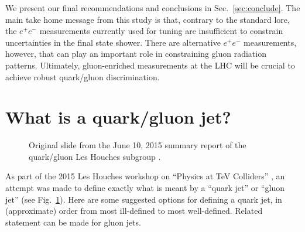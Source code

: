 \documentclass[11pt,letterpaper]{article}
\DeclareRobustCommand{\Sec}[1]{Sec.~\ref{#1}}
\DeclareRobustCommand{\Fig}[1]{Fig.~\ref{#1}}
\begin{document}
We present our final recommendations and conclusions in \Sec{sec:conclude}.  The main take home message from this study is that, contrary to the standard lore, the $e^+e^-$ measurements currently used for tuning are insufficient to constrain uncertainties in the final state shower.  There are alternative $e^+e^-$ measurements, however, that can play an important role in constraining gluon radiation patterns.  Ultimately, gluon-enriched measurements at the LHC will be crucial to achieve robust quark/gluon
discrimination.

\section{What is a quark/gluon jet?}
\label{sec:def}

\begin{figure}
\centering
{}
\caption{Original slide from the June 10, 2015 summary report of the quark/gluon Les Houches subgroup \cite{Badger:2016bpw}.}
\label{fig:summary_slide}
\end{figure}

As part of the 2015 Les Houches workshop on ``Physics at TeV Colliders'' \cite{Badger:2016bpw}, an attempt was made to
define exactly what is meant by a ``quark jet'' or ``gluon jet'' (see \Fig{fig:summary_slide}).
Here are some suggested options for defining a quark jet, in
(approximate) order from most ill-defined to most well-defined.
Related statement can be made for gluon jets.
\end{document}
